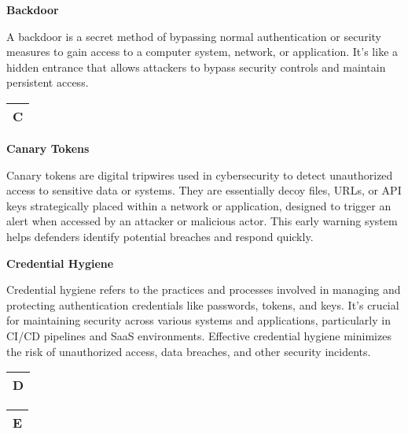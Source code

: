 \textbf{Backdoor}

A backdoor is a secret method of bypassing normal authentication or security measures to gain access to a computer system, network, or application. It's like a hidden entrance that allows attackers to bypass security controls and maintain persistent access.

\begin{table}
\justifying

\begin{tabular}{l}
\textbf{C} \\
\hline

\end{tabular}

\end{table}

\textbf{Canary Tokens}

Canary tokens are digital tripwires used in cybersecurity to detect unauthorized access to sensitive data or systems. They are essentially decoy files, URLs, or API keys strategically placed within a network or application, designed to trigger an alert when accessed by an attacker or malicious actor. This early warning system helps defenders identify potential breaches and respond quickly.

\textbf{Credential Hygiene}

Credential hygiene refers to the practices and processes involved in managing and protecting authentication credentials like passwords, tokens, and keys. It's crucial for maintaining security across various systems and applications, particularly in CI/CD pipelines and SaaS environments. Effective credential hygiene minimizes the risk of unauthorized access, data breaches, and other security incidents.

\begin{table}
\justifying

\begin{tabular}{l}
\textbf{D} \\
\hline

\end{tabular}

\end{table}

\begin{table}
\justifying

\begin{tabular}{l}
\textbf{E} \\
\hline

\end{tabular}

\end{table}

